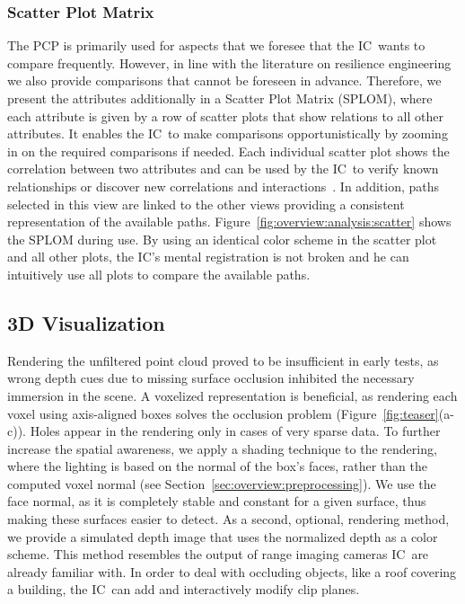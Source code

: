 \documentclass[review,journal]{vgtc}         %
\def\IC{IC}
\begin{document}
\subsubsection{Scatter Plot Matrix} \label{sec:overview:analysis:scatter}
The PCP is primarily used for aspects that we foresee that the \IC\ wants to compare frequently. However, in line with the literature on resilience engineering~\cite{Lundberg2012} we also provide comparisons that cannot be foreseen in advance. Therefore, we present the attributes additionally in a Scatter Plot Matrix (SPLOM), where each attribute is given by a row of scatter plots that show relations to all other attributes. It enables the \IC\ to make comparisons opportunistically by zooming in on the required comparisons if needed. Each individual scatter plot shows the correlation between two attributes and can be used by the \IC\ to verify known relationships or discover new correlations and interactions~\cite{Li2008}. In addition, paths selected in this view are linked to the other views providing a consistent representation of the available paths. Figure~\ref{fig:overview:analysis:scatter} shows the SPLOM during use. By using an identical color scheme in the scatter plot and all other plots, the \IC 's mental registration is not broken and he can intuitively use all plots to compare the available paths.


\subsection{3D Visualization} \label{sec:overview:3dvisualization}
 Rendering the unfiltered point cloud proved to be insufficient in early tests, as wrong depth cues due to missing surface occlusion inhibited the necessary immersion in the scene. A voxelized representation is beneficial, as rendering each voxel using axis-aligned boxes solves the occlusion problem (Figure~\ref{fig:teaser}(a-c)). Holes appear in the rendering only in cases of very sparse data. To further increase the spatial awareness, we apply a shading technique to the rendering, where the lighting is based on the normal of the box's faces, rather than the computed voxel normal (see Section~\ref{sec:overview:preprocessing}). We use the face normal, as it is completely stable and constant for a given surface, thus making these surfaces easier to detect. As a second, optional, rendering method, we provide a simulated depth image that uses the normalized depth as a color scheme. This method resembles the output of range imaging cameras \IC\ are already familiar with. In order to deal with occluding objects, like a roof covering a building, the \IC\ can add and interactively modify clip planes.
\end{document}
